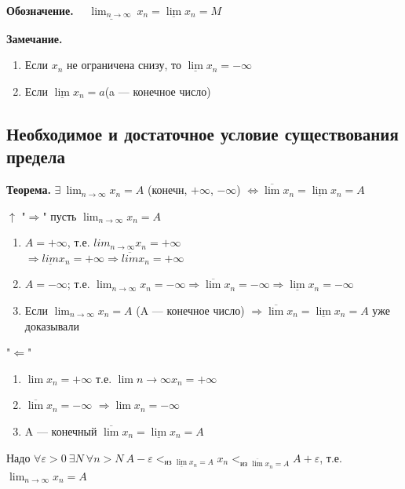 \documentclass{article}
\begin{document}
    \textbf{Обозначение.} \(\quad \underline{\lim_{n \rightarrow \infty}}\ x_n = \underline{\lim} x_n = M \)

    \textbf{Замечание.} 
    \begin{enumerate}
        \item Если \(x_n\) не ограничена снизу, то \(\underline{\lim}x_n = -\infty\)
        
        \item Если \(\underline{\lim}x_n = a\)(a --- конечное число)
    \end{enumerate}
	
    \subsection{Необходимое и достаточное условие существования предела}
    
    \textbf{Теорема.} \( \exists\ \lim_{n \rightarrow \infty} x_n = A \) (конечн, \(+\infty\), \(-\infty\)) \( \Leftrightarrow \overline{\lim}x_n = \underline{\lim}x_n = A \)

    \(\uparrow\)
    "\(\Rightarrow\)" пусть \(\lim_{n \rightarrow \infty}{x_n} = A\)

    \begin{enumerate}
        \item \( A = +\infty \), т.е. \( lim_{n \rightarrow \infty}x_n = +\infty \)\\
        \( \Rightarrow \underline{lim}x_n = +\infty \Rightarrow \overline{lim}x_n = +\infty \)   
        \item \(A = -\infty\); т.е. \(\lim_{n \rightarrow \infty}{x_n} = -\infty \Rightarrow \overline{\lim}x_n = -\infty \Rightarrow \underline{\lim}x_n = -\infty\)
        \item Если \( \lim_{n \rightarrow \infty}x_n = A \) (A --- конечное число) \( \Rightarrow \overline{\lim}x_n = \underline{\lim}x_n = A \) уже доказывали
    \end{enumerate}

    "\( \Leftarrow \)"
    \begin{enumerate}
        \item \(\lim x_n = +\infty\)
        т.е. \(\lim{n \rightarrow \infty}{x_n} = +\infty\)
        
        \item \( \overline{\lim}x_n = -\infty \)
        \( \Rightarrow \lim x_n = -\infty \)

        \item A --- конечный \(\overline{\lim} x_n = \underline{\lim} x_n = A\)
    \end{enumerate}
    Надо \( \forall \varepsilon > 0\ \exists N\ \forall n > N\ A - \varepsilon <_{\textrm{из } \underline{\lim}x_n = A} x_n <_{\textrm{из } \overline{\lim}x_n = A} A + \varepsilon \), т.е. \( \lim_{n \rightarrow \infty}x_n = A \)
    
\end{document}

